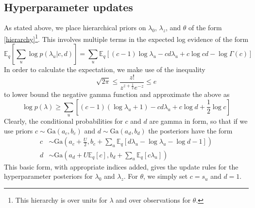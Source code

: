 \documentclass{article} %
\begin{document}
\subsection{Hyperparameter updates}
As stated above, we place hierarchical priors on $\lambda_0$, $\lambda_z$, and $\theta$ of the form \ref{hierarchy}\footnote{This hierarchy is over units for $\lambda$ and over observations for $\theta$.}. This involves multiple terms in the expected log evidence of the form
\begin{equation}
    \mathbb{E}_q \left[\sum_u \log p(\lambda_u|c, d)\right] = \sum_u \mathbb{E}_q \left[ 
    (c - 1) \log \lambda_u - cd\lambda_u + c \log cd - \log \Gamma(c) 
    \right] 
\end{equation}
In order to calculate the expectation, we make use of the inequality %
\begin{equation}
    \sqrt{2\pi} \le \frac{z!}{z^{z+\frac{1}{2}} e^{-z}} \le e
\end{equation}
to lower bound the negative gamma function and approximate the above as
\begin{equation}
    \log p(\lambda) \ge \sum_u \left[ 
    (c - 1) (\log \lambda_u + 1) - cd\lambda_u + c \log d + \frac{1}{2}\log c\right]
\end{equation}
Clearly, the conditional probabilities for $c$ and $d$ are gamma in form, so that if we use priors $c \sim \text{Ga}(a_c, b_c)$ and $d\sim \text{Ga}(a_d, b_d)$ the posteriors have the form
\begin{align}
    c &\sim \text{Ga}\left(a_c + \frac{U}{2}, 
    b_c + \sum_u\mathbb{E}_q 
        \left[d \lambda_u - \log \lambda_u - \log d - 1\right]\right) \\
    d &\sim \text{Ga}\left(
        a_d + U\mathbb{E}_q[c], b_d + \sum_u \mathbb{E}_q [c \lambda_u]
    \right)
\end{align}
This basic form, with appropriate indices added, gives the update rules for the hyperparameter posteriors for $\lambda_0$ and $\lambda_z$. For $\theta$, we simply set $c = s_u$ and $d = 1$.
\end{document}
